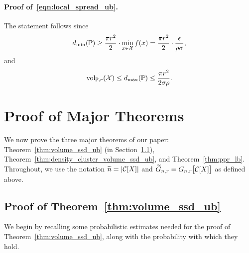 \paragraph{Proof of~\eqref{eqn:local_spread_ub}.}
	The statement follows since 
	\begin{equation*}
	d_{\min}(\mathbb{P}) \geq \frac{\pi r^2}{2} \cdot \min_{x \in \mathcal{X}} f(x) = \frac{\pi r^2}{2} \cdot \frac{\epsilon}{\rho \sigma},
	\end{equation*}
	and
	\begin{equation*}
	\mathrm{vol}_{\mathbb{P},r}(\mathcal{X}) \leq d_{\max}(\mathbb{P}) \leq \frac{\pi r^2}{2 \sigma \rho}.
	\end{equation*}
\section{Proof of Major Theorems}
\label{apdx:pf_major_theorems}
We now prove the three major theorems of our paper: Theorem~\ref{thm:volume_ssd_ub} (in Section~\ref{subsec:pf_volume_ssd_ub}), Theorem~\ref{thm:density_cluster_volume_ssd_ub}, and Theorem~\ref{thm:ppr_lb}.  Throughout, we use the notation $\widetilde{n} = |\mathcal{C}[X]|$ and $\widetilde{G}_{n,r} = G_{n,r}\bigl[\mathcal{C}[X]\bigr]$ as defined above.

\subsection{Proof of Theorem~\ref{thm:volume_ssd_ub}}
\label{subsec:pf_volume_ssd_ub}
We begin by recalling some probabilistic estimates needed for the proof of Theorem~\ref{thm:volume_ssd_ub}, along with the probability with which they hold.

